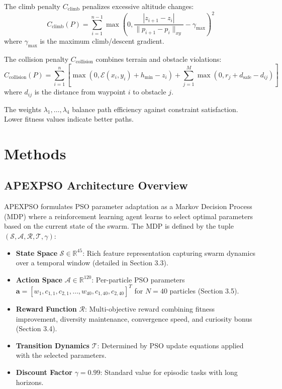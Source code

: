 \documentclass[fleqn,10pt]{wlscirep}
\begin{document}
The climb penalty $C_{\text{climb}}$ penalizes excessive altitude changes:
\begin{equation}
C_{\text{climb}}(P) = \sum_{i=1}^{n-1} \max\left(0, \frac{|z_{i+1} - z_i|}{\|p_{i+1} - p_i\|_{xy}} - \gamma_{\max}\right)^2
\end{equation}
where $\gamma_{\max}$ is the maximum climb/descent gradient.

The collision penalty $C_{\text{collision}}$ combines terrain and obstacle violations:
\begin{equation}
C_{\text{collision}}(P) = \sum_{i=1}^{n} \left[ \max(0, \mathcal{E}(x_i, y_i) + h_{\min} - z_i) + \sum_{j=1}^{M} \max(0, r_j + d_{\text{safe}} - d_{ij}) \right]
\end{equation}
where $d_{ij}$ is the distance from waypoint $i$ to obstacle $j$.

The weights $\lambda_1, \ldots, \lambda_4$ balance path efficiency against constraint satisfaction.
Lower fitness values indicate better paths.

\section*{Methods}
\label{sec:methods}

\subsection*{APEXPSO Architecture Overview}

APEXPSO formulates PSO parameter adaptation as a Markov Decision Process (MDP) where a reinforcement learning agent learns to select optimal parameters based on the current state of the swarm.
The MDP is defined by the tuple $(\mathcal{S}, \mathcal{A}, \mathcal{R}, \mathcal{T}, \gamma)$:

\begin{itemize}
\item \textbf{State Space} $\mathcal{S} \in \mathbb{R}^{45}$: Rich feature representation capturing swarm dynamics over a temporal window (detailed in Section 3.3).
\item \textbf{Action Space} $\mathcal{A} \in \mathbb{R}^{120}$: Per-particle PSO parameters $\mathbf{a} = [w_1, c_{1,1}, c_{2,1}, \ldots, w_{40}, c_{1,40}, c_{2,40}]^T$ for $N=40$ particles (Section 3.5).
\item \textbf{Reward Function} $\mathcal{R}$: Multi-objective reward combining fitness improvement, diversity maintenance, convergence speed, and curiosity bonus (Section 3.4).
\item \textbf{Transition Dynamics} $\mathcal{T}$: Determined by PSO update equations applied with the selected parameters.
\item \textbf{Discount Factor} $\gamma = 0.99$: Standard value for episodic tasks with long horizons.
\end{itemize}
\end{document}
